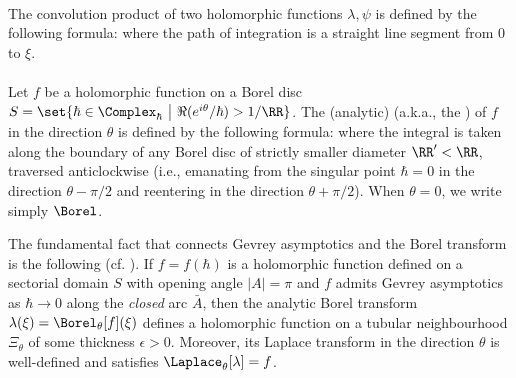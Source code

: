 \documentclass[11pt]{article}
\begin{document}
\begin{appendices}
\paragraph{}
The convolution product of two holomorphic functions $\lambda, \psi$ is defined by the following formula:
where the path of integration is a straight line segment from $0$ to $\xi$.

\paragraph{}
Let $f$ be a holomorphic function on a Borel disc $S = \set{ \hbar \in \Complex_\hbar ~\big|~ \Re (e^{i\theta}/\hbar) > 1/\RR }$.
The (analytic)  (a.k.a., the ) of $f$ in the direction $\theta$ is defined by the following formula:
where the integral is taken along the boundary of any Borel disc
of strictly smaller diameter $\RR' < \RR$, traversed anticlockwise (i.e., emanating from the singular point $\hbar = 0$ in the direction $\theta - \pi/2$ and reentering in the direction $\theta + \pi/2$).
When $\theta = 0$, we write simply $\Borel$.

The fundamental fact that connects Gevrey asymptotics and the Borel transform is the following (cf. \cite[Lemma B.5]{MY2008.06492}).
If $f = f(\hbar)$ is a holomorphic function defined on a sectorial domain $S$ with opening angle $|A| = \pi$ and $f$ admits Gevrey asymptotics as $\hbar \to 0$ along the \textit{closed} arc $\bar{A}$, then the analytic Borel transform $\lambda (\xi) = \Borel_\theta [f] (\xi)$ defines a holomorphic function on a tubular neighbourhood $\Xi_\theta$ of some thickness $\epsilon > 0$.
Moreover, its Laplace transform in the direction $\theta$ is well-defined and satisfies $\Laplace_\theta [\lambda] = f$.


\end{appendices}
\end{document}
